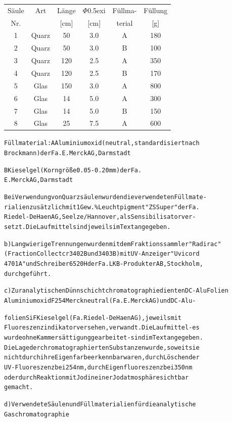 \documentclass[a4paper,11pt]{article}
\begin{document}
\begin{table}[h!]\ttfamily
\hspace{1cm}
\begin{tabular}{cccccc}
Säule & Art & Länge & $\Phi$\lower0.5ex\hbox{i} & Füllma- & Füllung\\
 Nr. & \  & [cm] & [cm] & terial & [g]\\[8pt]
1 & Quarz & 50 & 3.0 & A & 180\\[2pt]
2 & Quarz & 50 & 3.0 & B &100\\[2pt]
3 & Quarz &120 & 2.5 & A & 350\\[2pt]
4 & Quarz &120 & 2.5 & B & 170\\[2pt]
5 & Glas &150 & 3.0 & A & 800\\[2pt]
6 & Glas &14 & 5.0 & A & 300\\[2pt]
7 & Glas &14 & 5.0 & B &150\\[2pt]
8 & Glas & 25 & 7.5 & A & 600\\[2pt]
\end{tabular}
\end{table}
\begin{alltt}
   Füllmaterial: A  Aluminiumoxid (neutral, standardisiert nach
                    Brockmann) der Fa. E. Merck AG, Darmstadt

                 B  Kieselgel (Korngröße 0.05 - 0.20 mm) der Fa.
                    E. Merck AG, Darmstadt

   Bei Verwendung von Quarzsäulen wurden die verwendeten Füllmate-
   rialien zusätzlich mit 1 Gew. \% Leuchtpigment "ZS Super" der Fa.
   Riedel - De Haen AG, Seelze/Hannover, als Sensibilisator ver-
   setzt. Die Laufmittel sind jeweils im Text angegeben.

b) Langwierige Trennungen wurden mit dem Fraktionssammler "Radirac"
   (Fraction Collectcr 3402B und 3403B) mit UV-Anzeiger "Uvicord
   4701A" und Schreiber 6520H der Fa. LKB-Produkter AB, Stockholm,
   durchgeführt.

c) Zur analytischen Dünnschichtchromatographie dienten DC-AluFolien
   Aluminiumoxid F 254 Merck neutral (Fa. E. Merck AG) und DC-Alu-

 

\newpage
{}


   folien SiF Kieselgel (Fa. Riedel - De Haen AG), jeweils mit
   Fluoreszenzindikator versehen, verwandt. Die Laufmittel - es
   wurde ohne Kammersättigung gearbeitet - sind im Text angegeben.
   Die Lage der chromatographierten Substanzen wurde, soweit sie
   nicht durch ihre Eigenfarbe erkennbar waren, durch Löschen der
   UV-Fluoreszenz bei 254 nm, durch Eigenfluoreszenz bei 350 nm
   oder durch Reaktion mit Jod in einer Jodatmosphäre sichtbar
   gemacht.

d) Verwendete Säulen und Füllmaterialien für die analytische
   Gaschromatographie
\end{alltt}
\end{document}
